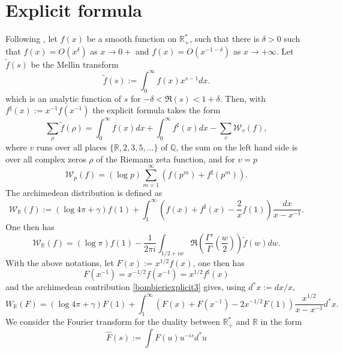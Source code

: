 \documentclass[reqno,12pt]{amsart}
\def\Q{{\mathbb Q}}
\def\R{{\mathbb R}}
\begin{document}
\section{Explicit formula}\label{explicit}
Following \cite{EB}, let $f(x)$ be a smooth function on  $\mathbb{R}_{+}^*$, such that there is $\delta>0$ such that $f(x)=O\left(x^\delta\right)$ as $x \rightarrow 0+$ and $f(x)=O\left(x^{-1-\delta}\right)$ as $x \rightarrow+\infty$.
Let $\widetilde{f}(s)$ be the Mellin transform
\begin{equation}\label{mellin}
 \tilde f(s):=\int_0^\infty f(x)x^{s-1}dx.
 \end{equation}
which is an analytic function of $s$ for $-\delta<\Re(s)<1+\delta$.
 Then, with $f^\sharp(x):=x^{-1}f(x^{-1})$  the explicit formula takes the form 
 \begin{equation}\label{bombieriexplicit0}
 \sum_{\rho}\tilde f(\rho)=\int_0^\infty f(x)dx+\int_0^\infty f^\sharp(x)dx-\sum_v {\mathcal W}_v(f),
 \end{equation}
 where $v$ runs over all places  $\{\R,2,3,5,\ldots \}$ of $\Q$,  the  sum on the left hand side is over all complex zeros $\rho$ of the Riemann zeta function, and for $v=p$ 
 \begin{equation}\label{bombieriexplicit1}
 {\mathcal W}_p(f)=(\log p)\sum_{m=1}^\infty\left(f(p^m)+f^\sharp(p^m)\right).
 \end{equation}
 The archimedean distribution is defined as
 \begin{equation}\label{bombieriexplicit2}
 {\mathcal W}_\R(f):=(\log 4\pi +\gamma)f(1)+\int_{1}^\infty\left(f(x)+f^\sharp(x)-\frac 2x f(1)\right)\frac{dx}{x-x^{-1}}.
 \end{equation}
 One then has
  \begin{equation}\label{bombieriexplicit3}
 {\mathcal W}_\R(f)=(\log \pi)f(1)-\frac{1}{2\pi i}\int_{1/2+iw}\Re\left(\frac{\Gamma'}{\Gamma}\left(\frac w2\right)\right)\tilde f(w)dw.
\end{equation}
  With the above notations, let $F(x):=x^{1/2}f(x)$, one then has 
   $$F(x^{-1})=x^{-1/2}f(x^{-1})=x^{1/2}f^\sharp(x)$$
and the archimedean contribution \eqref{bombieriexplicit3} gives, using $d^*x:=dx/x$,
\begin{equation}\label{bombieriexplicit}
 W_\R(F)=(\log 4\pi +\gamma)F(1)+\int_{1}^\infty\left(F(x)+F(x^{-1})-2x^{-1/2} F(1)\right)\frac{x^{1/2}}{x-x^{-1}}d^*x.
 \end{equation}
 We consider the  Fourier transform for the duality between $\R_+^*$ and $\R$ in the form
 \begin{equation}\label{fourierm}
 {\widehat F}(s):=\int F(u)u^{-is}d^*u
 \end{equation}
\end{document}
